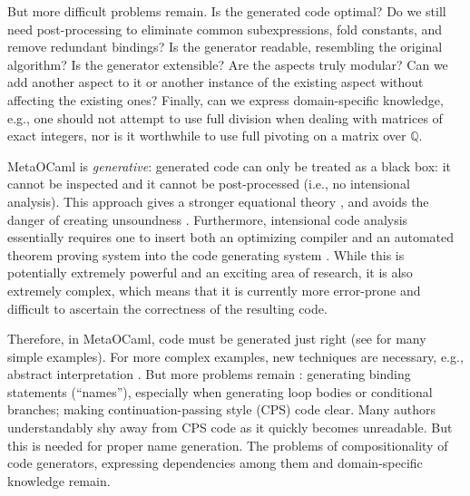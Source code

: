 \documentclass[draft]{elsart}
\begin{document}
But more difficult problems remain. Is the generated code optimal? Do
we still need post-processing to eliminate common subexpressions,
fold constants, and remove redundant bindings? Is the generator readable,
resembling the original algorithm? Is the generator extensible? Are the aspects
truly modular? Can we add another aspect to it or another instance of
the existing aspect without affecting the existing ones? Finally, can
we express domain-specific knowledge, e.g., one should not attempt to
use full division when dealing with matrices of exact integers, nor is
it worthwhile to use full pivoting on a matrix over $\mathbb Q$.

MetaOCaml is \emph{generative}: generated code can only be treated as
a black box: it cannot be inspected and it cannot be post-processed
(i.e., no intensional analysis). This approach gives a stronger
equational theory \cite{Taha2000}, and avoids the danger of creating
unsoundness \cite{TahaThesis}. Furthermore, intensional code analysis
essentially requires one to insert both an optimizing compiler and an
automated theorem proving system into the code generating system
\cite{Pueschel:05,Kennedy01Telescoping,dongarra7,Veldhuizen:2004}.
While this is potentially extremely powerful and an exciting area of
research, it is also extremely complex, which means that it is
currently more error-prone and difficult to ascertain the correctness
of the resulting code.

Therefore, in MetaOCaml, code must be generated just right (see
\cite{TahaThesis} for many simple examples).  For more complex
examples, new techniques are necessary, e.g., abstract interpretation
\cite{KiselyovTaha}.  But more problems remain
\cite{Padua:MetaOcaml:04}: generating binding statements (``names''),
especially when generating loop bodies or conditional branches; making
continuation-passing style (CPS) code clear.  Many authors
understandably shy away from CPS code as it quickly becomes
unreadable.  But this is needed for proper name generation.
The problems of compositionality of code generators, expressing
dependencies among them and domain-specific knowledge remain.
\end{document}
